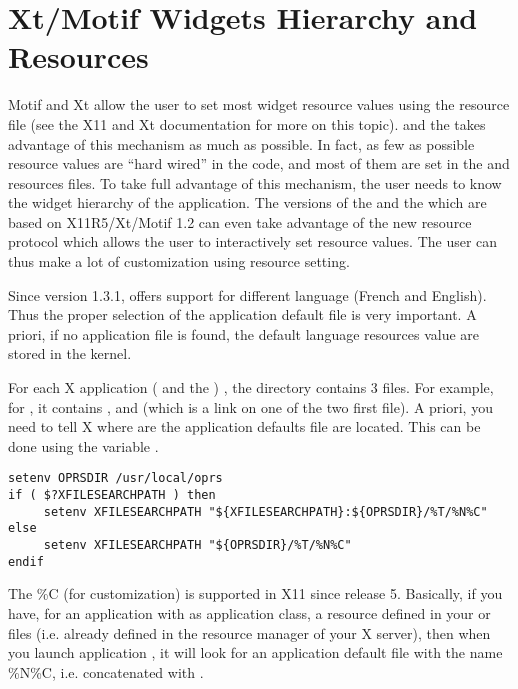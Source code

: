 \chapter{Xt/Motif Widgets Hierarchy and Resources}

Motif and Xt allow the user to set most widget resource values using the
resource file (see the X11 \cite{Xlib-manual} and Xt \cite{Xt-manual}
documentation for more on this topic).  \XOPRS{} and the \OPE{} takes advantage
of this mechanism as much as possible. In fact, as few as possible resource
values are ``hard wired'' in the code, and most of them are set in the
 and  resources files. To take full advantage
of this mechanism, the user needs to know the widget hierarchy of the
application. The versions of the \XOPRS{} and the \OPE{} which are based on
X11R5/Xt/Motif 1.2 can even take advantage of the new resource protocol which
allows the user to interactively set resource values. The user can thus make a
lot of customization using resource setting.

Since version 1.3.1, \COPRS{} offers support for different language (French and
English). Thus the proper selection of the application default file is very
important. A priori, if no application file is found, the default language
resources value are stored in the kernel. 

For each X application (\XOPRS{} and the \OPE{}) , the 
directory contains 3 files.  For example, for \XOPRS{}, it contains
,  and  (which is a link on one of the
two first file). A priori, you need to tell X where are the application
defaults file are located. This can be done using the variable
.

\begin{verbatim}
setenv OPRSDIR /usr/local/oprs
if ( $?XFILESEARCHPATH ) then
     setenv XFILESEARCHPATH "${XFILESEARCHPATH}:${OPRSDIR}/%T/%N%C"
else
     setenv XFILESEARCHPATH "${OPRSDIR}/%T/%N%C"
endif
\end{verbatim}

The \%C (for customization) is supported in X11 since release 5. Basically, if
you have, for an application  with  as
application class, a  resource
defined in your  or  files (i.e. already
defined in the resource manager of your X server), then when you launch
application , it will look for an application default file with
the name \%N\%C, i.e.  concatenated with .

